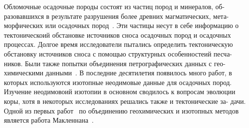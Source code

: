 \documentclass[a4paper,12pt]{article}
\begin{document}
Обломочные осадочные породы состоят из частиц пород и минералов, об- разовавшихся в результате разрушения более древних магматических, мета- морфических или осадочных пород~\parencite{art}.
Эти частицы несут в себе информацию о тектоническоий обстановке источников сноса осадочных пород и осадочных процессах. Долгое время исследователи пытались определить тектоническую обстановку источников сноса с помощью структурных особенностеий песча- ников. Были также попытки объединения петрографических данных с гео- химическими данными~\parencite{batlas}. 
В последние десятилетия появилось много работ, в которых используются изотопные неодимовые данные для осадочных пород. Изучение неодимовоий изотопии в основном сводилось к вопросам эволюции коры, хотя в некоторых исследованиях решались также и тектонические за- дачи. Одной из первых работ~\parencite{l1999} по объединению геохимических и изотопных методов является работа Макленнана~\parencite{fart}.

\printbibliography[sorting=nyt]
\end{document}
